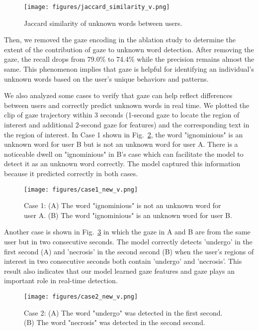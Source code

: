 \begin{figure}
  \centering
  \texttt{[image: figures/jaccard\_similarity\_v.png]}
  \caption{Jaccard similarity of unknown words between users.}
  \label{fig:similarity} 
\end{figure}

Then, we removed the gaze encoding in the ablation study to determine the extent of the contribution of gaze to unknown word detection. After removing the gaze, the recall drops from 79.0\% to 74.4\% while the precision remains almost the same. This phenomenon implies that gaze is helpful for identifying an individual's unknown words based on the user's unique behaviors and patterns.

We also analyzed some cases to verify that gaze can help reflect differences between users and correctly predict unknown words in real time. We plotted the clip of gaze trajectory within 3 seconds (1-second gaze to locate the region of interest and additional 2-second gaze for features) and the corresponding text in the region of interest. In Case 1 shown in Fig.~\ref{fig:case_ignominious}, the word "ignominious" is an unknown word for user B but is not an unknown word for user A. There is a noticeable dwell on "ignominious" in B's case which can facilitate the model to detect it as an unknown word correctly. The model captured this information because it predicted correctly in both cases. 

\begin{figure}
  \centering
  \texttt{[image: figures/case1\_new\_v.png]}
  \caption{Case 1: (A) The word "ignominious" is not an unknown word for user A. (B) The word "ignominious" is an unknown word for user B.}
  \label{fig:case_ignominious} 
\end{figure}

Another case is shown in Fig.~\ref{fig:case_2} in which the gaze in A and B are from the same user but in two consecutive seconds. The model correctly detects 'undergo' in the first second (A) and 'necrosis' in the second second (B) when the user's regions of interest in two consecutive seconds both contain 'undergo' and 'necrosis'. This result also indicates that our model learned gaze features and gaze plays an important role in real-time detection.

\begin{figure}
  \centering
  \texttt{[image: figures/case2\_new\_v.png]}
  \caption{Case 2: (A) The word "undergo" was detected in the first second. (B) The word "necrosis" was detected in the second second.}
  \label{fig:case_2} 
\end{figure}

